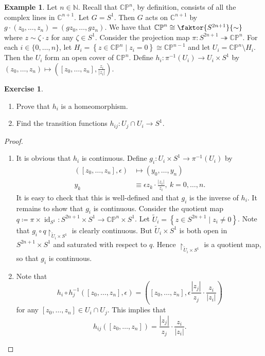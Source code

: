 \documentclass[10pt,letterpaper,cm]{nupset}
\theoremstyle{definition}
\newtheorem{exmp}[defn]{Example}
\theoremstyle{theorem}
\newtheorem{exercise}[defn]{Exercise}
\theoremstyle{remark}
\newcommand{\C}{\mathbb C}
\newcommand{\CP}{\mathbb{CP}}
\newcommand{\N}{\mathbb N}
\newcommand{\1}{\mathbb{1}}
\newcommand{\0}{\vec 0}
\DeclareMathOperator{\id}{id}
\newcommand{\be}{\begin{enumerate}}
\newcommand{\ee}{\end{enumerate}}
\begin{document}
\begin{exmp}
Let $n\in \N$. Recall that $\CP^n$, by definition, consists of all the complex lines in $\C^{n+1}$. Let $G = S^1$. Then $G$ acts on $\C^{n+1}$ by $g\cdot \left(z_0, \ldots, z_n\right) = \left(gz_0, \ldots, gz_n\right)$. We have that $\CP^n \cong \faktor{S^{2n+1}}{\sim}$ where $z\sim \zeta\cdot z$ for any $\zeta \in S^1$. Consider the projection map $\pi : S^{2n+1} \twoheadrightarrow \CP^n$. For each $i\in \{0, \ldots, n\}$, let $H_i = \left\{z\in \CP^n \mid z_i =0\right\} \cong \CP^{n-1}$ and let $U_i = \CP^n \setminus H_i$. Then the $U_i$ form an open cover of $\CP^n$.  Define $h_i : \pi^{-1}\left(U_i\right) \to U_i \times S^1$ by $\left(z_0, \ldots, z_n\right) \mapsto \left(\left[z_0, \ldots, z_n\right], \frac{z_i}{\left\lvert{z_i}\right\rvert}\right)$. 

\begin{exercise} $ $
\be
\item Prove that $h_i$ is a homeomorphism.
\item Find the transition functions $h_{ij} : U_j \cap U_i \to S^1$.
\ee
\end{exercise}
\begin{proof} $ $
\be
\item It is obvious that $h_i$ is continuous. Define $g_i : U_i \times S^1 \to \pi^{-1}\left(U_i\right)$ by 
\begin{align*}
\left(\left[z_0, \ldots, z_n\right], \epsilon \right) &  \mapsto \left(y_0, \ldots, y_n\right)
\\ y_k & \equiv \epsilon{z_k}\cdot \frac{\left\lvert{z_i}\right\rvert}{z_i}, \ k =0, \ldots, n.
\end{align*}
It is easy to check that this is well-defined and that $g_i$ is the inverse of $h_i$. It remains to show that $g_i$ is continuous. Consider the quotient map  $q\coloneqq \pi \times \id_{S^1}: S^{2n+1} \times S^1 \to \CP^n \times S^1$. Let $\widetilde{U}_i = \left\{z \in S^{2n+1} \mid z_i \ne 0\right\}$. Note that $g_i \circ q\restriction_{\widetilde{U}_i \times S^1}$ is clearly continuous. But $\widetilde{U}_i \times S^1$ is both open in $S^{2n+1} \times S^1$ and saturated with respect to $q$. Hence $\restriction_{\widetilde{U}_i \times S^1}$ is a quotient map, so that $g_i$ is continuous.  
\item Note that 
\[
h_i \circ h_j^{-1}\left(\left[z_0, \ldots, z_n\right], \epsilon\right) = \left(\left[z_0, \ldots, z_n\right], \epsilon  \frac{\left\lvert{z_j}\right\rvert}{z_j} \cdot \frac{z_i}{\left\lvert{z_i}\right\rvert}\right)
\] for any $\left[z_0, \ldots, z_n\right] \in U_i \cap U_j$. This implies that $$h_{ij}\left(\left[z_0, \ldots, z_n\right]\right) = \frac{\left\lvert{z_j}\right\rvert}{z_j} \cdot \frac{z_i}{\left\lvert{z_i}\right\rvert}.$$
\ee
\end{proof}


\end{exmp}
\end{document}
